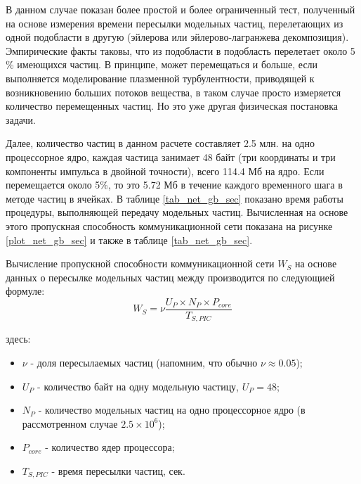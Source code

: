 В данном случае показан более простой и более ограниченный тест, полученный на основе измерения времени пересылки модельных частиц, перелетающих из одной подобласти в другую (эйлерова или эйлерово-лагранжева декомпозиция). Эмпирические факты таковы, что из подобласти в подобласть перелетает около 5 \% имеющихся частиц. В принципе, может перемещаться и больше, если выполняется моделирование плазменной турбулентности, приводящей к возникновению больших потоков вещества, в таком случае просто измеряется количество перемещенных частиц. Но это уже другая физическая постановка задачи.

Далее, количество частиц в данном расчете составляет 2.5 млн. на одно процессорное ядро, каждая частица занимает 48 байт (три координаты и три компоненты импульса в двойной точности), всего 114.4 Мб на ядро. Если перемещается около 5\%, то это 5.72 Мб в течение каждого временного шага в методе частиц в ячейках. В таблице \ref{tab_net_gb_sec} показано время работы процедуры, выполняющей передачу модельных частиц. Вычисленная на основе этого пропускная способность коммуникационной сети показана на рисунке \ref{plot_net_gb_sec} и также в таблице \ref{tab_net_gb_sec}.



Вычисление пропускной способности коммуникационной сети $W_S$ на основе данных о пересылке модельных частиц между  производится по следующией формуле:
\begin{equation}
W_S =  \nu \frac{U_P\times N_P \times P_{core}}{T_{S,PIC}}
\label{Net_performance_peer}
\end{equation}


здесь:
\begin{itemize}
	\item $\nu$ - доля пересылаемых частиц (напомним, что обычно $\nu \approx 0.05$);
	\item $U_P$ - количество байт на одну модельную частицу, $U_P = 48$;
	\item $N_P$ - количество модельных частиц на одно процессорное ядро (в рассмотренном случае $2.5\times 10^6$);  
	\item $P_{core}$ - количество ядер процессора;
	\item $T_{S,PIC}$  - время пересылки частиц, сек.
\end{itemize}	



